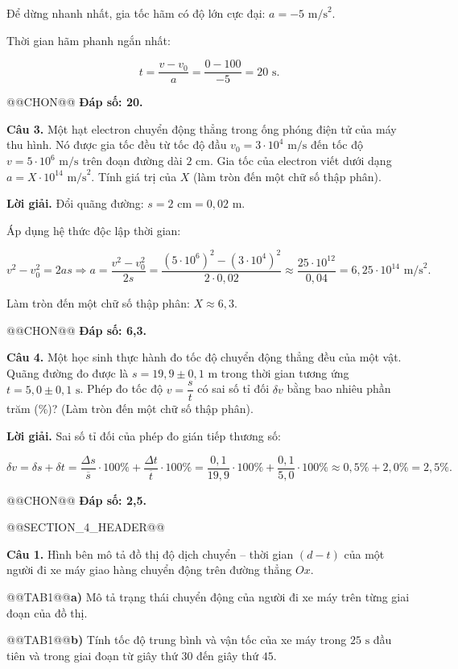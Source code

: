 \documentclass{article}
\begin{document}
Để dừng nhanh nhất, gia tốc hãm có độ lớn cực đại: $a = -5\text{ m/s}^2$.

Thời gian hãm phanh ngắn nhất:

\[t = \frac{v - v_0}{a} = \frac{0 - 100}{-5} = 20\text{ s}.\]

@@CHON@@ \textbf{Đáp số: 20.}

\textbf{Câu 3.} Một hạt electron chuyển động thẳng trong ống phóng điện tử của máy thu hình. Nó được gia tốc đều từ tốc độ đầu $v_0 = 3 \cdot 10^4\text{ m/s}$ đến tốc độ $v = 5 \cdot 10^6\text{ m/s}$ trên đoạn đường dài $2\text{ cm}$. Gia tốc của electron viết dưới dạng $a = X \cdot 10^{14}\text{ m/s}^2$. Tính giá trị của $X$ (làm tròn đến một chữ số thập phân).

\textbf{Lời giải.} Đổi quãng đường: $s = 2\text{ cm} = 0{,}02\text{ m}$.

Áp dụng hệ thức độc lập thời gian:

\[v^2 - v_0^2 = 2as \Rightarrow a = \frac{v^2 - v_0^2}{2s} = \frac{(5 \cdot 10^6)^2 - (3 \cdot 10^4)^2}{2 \cdot 0{,}02} \approx \frac{25 \cdot 10^{12}}{0{,}04} = 6{,}25 \cdot 10^{14}\text{ m/s}^2.\]

Làm tròn đến một chữ số thập phân: $X \approx 6{,}3$.

@@CHON@@ \textbf{Đáp số: 6,3.}

\textbf{Câu 4.} Một học sinh thực hành đo tốc độ chuyển động thẳng đều của một vật. Quãng đường đo được là $s = 19{,}9 \pm 0{,}1\text{ m}$ trong thời gian tương ứng $t = 5{,}0 \pm 0{,}1\text{ s}$. Phép đo tốc độ $v = \dfrac{s}{t}$ có sai số tỉ đối $\delta v$ bằng bao nhiêu phần trăm (\%)? (Làm tròn đến một chữ số thập phân).

\textbf{Lời giải.} Sai số tỉ đối của phép đo gián tiếp thương số:

\[\delta v = \delta s + \delta t = \frac{\Delta s}{\overline{s}} \cdot 100\% + \frac{\Delta t}{\overline{t}} \cdot 100\% = \frac{0{,}1}{19{,}9} \cdot 100\% + \frac{0{,}1}{5{,}0} \cdot 100\% \approx 0{,}5\% + 2{,}0\% = 2{,}5\%.\]

@@CHON@@ \textbf{Đáp số: 2,5.}

@@SECTION_4_HEADER@@

\textbf{Câu 1.} Hình bên mô tả đồ thị độ dịch chuyển -- thời gian $(d - t)$ của một người đi xe máy giao hàng chuyển động trên đường thẳng $Ox$.

@@TAB1@@\textbf{a)} Mô tả trạng thái chuyển động của người đi xe máy trên từng giai đoạn của đồ thị.

@@TAB1@@\textbf{b)} Tính tốc độ trung bình và vận tốc của xe máy trong $25\text{ s}$ đầu tiên và trong giai đoạn từ giây thứ $30$ đến giây thứ $45$.
\end{document}
